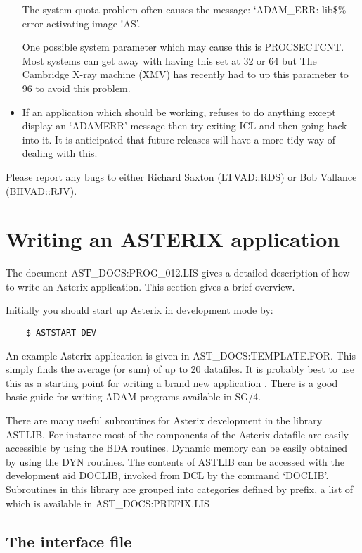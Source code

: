 \begin{itemize}
   The system quota problem often causes the message:
     `ADAM\_ERR: lib\$\% error activating image !AS'.

   One possible system parameter which may cause this is PROCSECTCNT. 
   Most systems can get away with having this set at 32 or 64 but
   The Cambridge X-ray machine (XMV) has recently had to up this 
   parameter to 96 to avoid this problem.

\item If an application which should be working, refuses to do anything
   except display an `ADAMERR' message then try exiting ICL and then
   going back into it.  It is anticipated that future releases will
   have a more tidy way of dealing with this.

\end{itemize}

Please report any bugs to either Richard Saxton (LTVAD::RDS)
or Bob Vallance (BHVAD::RJV).

\section{Writing an ASTERIX application }

The document AST\_DOCS:PROG\_012.LIS gives a detailed description of how to
write an Asterix application.
This section gives a brief overview.

Initially you should start up Asterix in development mode by:
\begin{verbatim}
    $ ASTSTART DEV
\end{verbatim}
An example Asterix application is given in AST\_DOCS:TEMPLATE.FOR.
This simply finds the average (or sum) of up to 20 datafiles.
It is probably best to use this as a starting point for writing a
brand new application . There is a good basic guide for writing ADAM
programs available in SG/4.

There are many useful subroutines for Asterix 
development in the library ASTLIB. For instance most of the components
of the Asterix datafile are easily accessible by using the BDA routines.
Dynamic memory can be easily obtained by using the DYN routines. The
contents of ASTLIB can be accessed with the development aid DOCLIB,
invoked from DCL by the command `DOCLIB'. Subroutines in this library
are grouped into categories defined by prefix, a list of which 
is available in AST\_DOCS:PREFIX.LIS

\subsection{The interface file }

